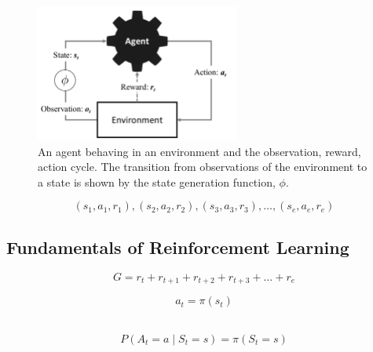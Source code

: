 \documentclass[xcolor={table}]{beamer}
\begin{document}
 \begin{frame} 
\begin{figure}[htb]
       \begin{centering}
       \includegraphics[width=0.6\textwidth]{images/fmlpda_figure_11_1.pdf}
       \caption{An agent behaving in an environment and the observation, reward, action cycle. The transition from observations of the environment to a state is shown by the state generation function, $\phi$.}
       \label{fig:rl_framework}
       \end{centering}
\end{figure}
\end{frame} 



 \begin{frame} 
\begin{equation}
(s_1, a_1, r_1), (s_2, a_2, r_2), (s_3, a_3, r_3), \ldots ,(s_e, a_e, r_e)
\end{equation}
\end{frame} 


\subsection{Fundamentals of Reinforcement Learning}



 \begin{frame} 
 \begin{equation}
G = r_t + r_{t+1}+r_{t+2} +r_{t+3} + \ldots +r_{e}
\label{eqn:rerurn_def}
\end{equation}
\end{frame} 



 \begin{frame} 
\begin{equation}
a_t = \pi(s_t)
\end{equation}

~\\

\begin{equation}
\label{eqn:policy_prob_dist}
P(A_t = a \mid S_t = s) = \pi(S_t = s)
\end{equation}
\end{frame} 
\end{document}
